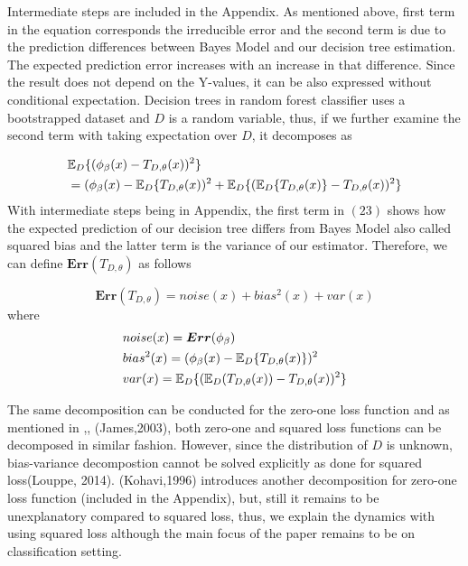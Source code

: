 Intermediate steps are included in the Appendix. As mentioned above, first term in the equation corresponds the 
irreducible error and the second term is due to the prediction differences between Bayes Model and our decision tree estimation. 
The expected prediction error increases with an increase in that difference. Since the result does not depend on the Y-values, 
it can be also expressed without conditional expectation. Decision trees in random forest classifier uses a bootstrapped dataset 
and $D$ is a random variable, thus, if we further examine the second term with taking expectation over $D$, it decomposes as

\begin{align}\label{eq:decomp_squared_loss_cont}
& \mathbb{E}_{D}\{(\phi_{\beta}(x) - T_{D,\theta}(x))^2 \} \notag \\
&= (\phi_{\beta}(x) - \mathbb{E}_{D}\{T_{D,\theta}(x))^2 + \mathbb{E}_{D}\{(\mathbb{E}_{D}\{T_{D,\theta}(x)\} - T_{D,\theta}(x))^2\}
\end{align}
With intermediate steps being in Appendix, the first term in $(23)$ shows how the expected prediction of our 
decision tree differs from Bayes Model also called squared bias and the latter term is the variance of our estimator. 
Therefore, we can define $\boldsymbol{Err}(T_{D,\theta})$ as follows

\begin{equation}
\boldsymbol{Err}(T_{D,\theta}) = noise(x) + bias^2(x) + var(x)
\end{equation}
where
\begin{align}
& noise(x) = \boldsymbol{Err}(\phi_{\beta}) \notag \\
& bias^2(x) = (\phi_{\beta}(x) - \mathbb{E}_{D}\{T_{D,\theta}(x)\})^2 \notag \\
& var(x) = \mathbb{E}_{D}\{(\mathbb{E}_{D}(T_{D,\theta}(x)) - T_{D,\theta}(x))^2\} \notag
\end{align}

The same decomposition can be conducted for the zero-one loss function and as mentioned in 
\cite{louppe2014understanding},\cite{domingos2000decomposition}, (James,2003), \cite{friedman1997zeroLoss}
both zero-one and squared loss functions can be decomposed in similar fashion. However, since the distribution of $D$ is unknown, bias-variance decompostion cannot be solved explicitly as done for squared loss(Louppe, 2014). (Kohavi,1996) introduces another decomposition for zero-one loss function (included in the Appendix), but, still it remains to be unexplanatory compared to squared loss, thus, we explain the dynamics with using squared loss although the main focus of the paper remains to be on classification setting.

